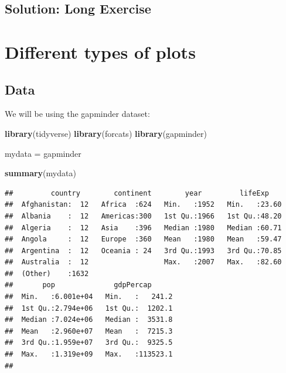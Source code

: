 \documentclass[]{book}
\makeatletter
\newenvironment{Shaded}{\begin{snugshade}}{\end{snugshade}}
\newcommand{\DataTypeTok}[1]{\textcolor[rgb]{0.13,0.29,0.53}{#1}}
\newcommand{\DecValTok}[1]{\textcolor[rgb]{0.00,0.00,0.81}{#1}}
\newcommand{\KeywordTok}[1]{\textcolor[rgb]{0.13,0.29,0.53}{\textbf{#1}}}
\newcommand{\NormalTok}[1]{#1}
\newcommand{\OperatorTok}[1]{\textcolor[rgb]{0.81,0.36,0.00}{\textbf{#1}}}
\newcommand{\StringTok}[1]{\textcolor[rgb]{0.31,0.60,0.02}{#1}}
\newenvironment{kframe}{%
\medskip{}
\setlength{\fboxsep}{.8em}
 \def\at@end@of@kframe{}%
 \ifinner\ifhmode%
  \def\at@end@of@kframe{\end{minipage}}%
  \begin{minipage}{\columnwidth}%
 \fi\fi%
 \def\FrameCommand##1{\hskip\@totalleftmargin \hskip-\fboxsep
 \colorbox{shadecolor}{##1}\hskip-\fboxsep
     \hskip-\linewidth \hskip-\@totalleftmargin \hskip\columnwidth}%
 \MakeFramed {\advance\hsize-\width
   \@totalleftmargin\z@ \linewidth\hsize
   \@setminipage}}%
 {\par\unskip\endMakeFramed%
 \at@end@of@kframe}
\renewenvironment{Shaded}{\begin{kframe}}{\end{kframe}}
\theoremstyle{definition}
\theoremstyle{definition}
\theoremstyle{definition}
\theoremstyle{remark}
\makeatother
\begin{document}
\hypertarget{solution-long-exercise}{%
\section{Solution: Long Exercise}\label{solution-long-exercise}}

\begin{Shaded}
\end{Shaded}

\hypertarget{different-types-of-plots}{%
\chapter{Different types of plots}\label{different-types-of-plots}}

\hypertarget{data-2}{%
\section{Data}\label{data-2}}

We will be using the gapminder dataset:

\begin{Shaded}
\begin{Highlighting}[]
\KeywordTok{library}\NormalTok{(tidyverse)}
\KeywordTok{library}\NormalTok{(forcats)}
\KeywordTok{library}\NormalTok{(gapminder)}

\NormalTok{mydata =}\StringTok{ }\NormalTok{gapminder}

\KeywordTok{summary}\NormalTok{(mydata)}
\end{Highlighting}
\end{Shaded}

\begin{verbatim}
##         country        continent        year         lifeExp     
##  Afghanistan:  12   Africa  :624   Min.   :1952   Min.   :23.60  
##  Albania    :  12   Americas:300   1st Qu.:1966   1st Qu.:48.20  
##  Algeria    :  12   Asia    :396   Median :1980   Median :60.71  
##  Angola     :  12   Europe  :360   Mean   :1980   Mean   :59.47  
##  Argentina  :  12   Oceania : 24   3rd Qu.:1993   3rd Qu.:70.85  
##  Australia  :  12                  Max.   :2007   Max.   :82.60  
##  (Other)    :1632                                                
##       pop              gdpPercap       
##  Min.   :6.001e+04   Min.   :   241.2  
##  1st Qu.:2.794e+06   1st Qu.:  1202.1  
##  Median :7.024e+06   Median :  3531.8  
##  Mean   :2.960e+07   Mean   :  7215.3  
##  3rd Qu.:1.959e+07   3rd Qu.:  9325.5  
##  Max.   :1.319e+09   Max.   :113523.1  
## 
\end{verbatim}
\end{document}
